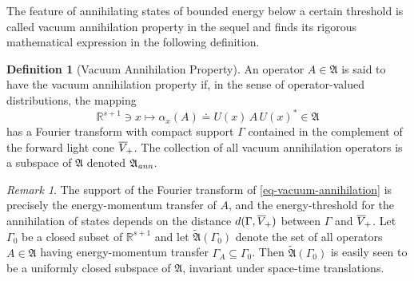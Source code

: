 \documentclass[11pt,twoside,openright]{report}
\theoremstyle{definition}
\newtheorem{Def}{Definition}[chapter]
\theoremstyle{plain}
\theoremstyle{remark}
\newtheorem*{Rem}{Remark}
\theoremstyle{assumption}
\newcommand{\Afrak}{\mathfrak{A}}
\newcommand{\Rsone}{\mathbb{R}^{s + 1}}
\newcommand{\Aann}{\mathfrak{A}_{\text{\itshape ann}}}
\newcommand{\fwcone}{\overline{V}_{\negthinspace +}}
\newcommand{\ax}{\alpha_x}
\begin{document}
The feature of annihilating states of bounded energy below a certain
threshold is called vacuum annihilation property in the sequel and
finds its rigorous mathematical expression in the following definition.
\begin{Def}[Vacuum Annihilation Property]
  \label{Def-vacuum-annihilation}
  An operator $A \in \Afrak$ is said to have the vacuum annihilation
  property if, in the sense of operator-valued distributions, the
  mapping
  \begin{equation}
    \label{eq-vacuum-annihilation}
    \Rsone \ni x \mapsto \ax ( A ) \doteq U ( x ) \, A \, U ( x )^*
    \in \Afrak
  \end{equation}
  has a Fourier transform with compact support $\Gamma$ contained in
  the complement of the forward light cone $\fwcone$. The collection
  of all vacuum annihilation operators is a subspace of $\Afrak$
  denoted $\Aann$.
\end{Def}
\begin{Rem}
The support of the Fourier transform of \eqref{eq-vacuum-annihilation}
is precisely the energy-momen\-tum transfer of $A$, and the
energy-threshold for the annihilation of states depends on the
distance $d ( \Gamma , \fwcone )$ between $\Gamma$ and $\fwcone$. Let
$\Gamma_0$ be a closed subset of $\Rsone$ and let $\widetilde{\Afrak}
( \Gamma_0 )$ denote the set of all operators $A \in \Afrak$ having
energy-momentum transfer $\Gamma_A \subseteq \Gamma_0$. Then
$\widetilde{\Afrak} ( \Gamma_0 )$ is easily seen to be a uniformly
closed subspace of $\Afrak$, invariant under space-time translations.
\end{Rem}
\end{document}
